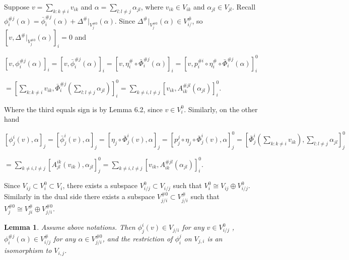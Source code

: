 \def\CTEXPreproc{Created by ctex v0.2.12, don't edit!}\documentclass[11pt]{article}
\newtheorem{lem}{Lemma}[section]
\begin{document}
\begin{pf} Suppose $v=\sum_{k:k\neq i} v_{ik}$ and $\alpha=\sum_{l:l\neq j} \alpha_{jl}$, where $v_{ik}\in V_{ik}$ and $\alpha_{jl}\in V_{jl}$. Recall $ \phi^{\# j} _i (\alpha )= \bar{\phi}^{\# j}_i (\alpha )+ \Delta^{\#}|_{V^{\# 0}_j }(\alpha)  $. Since
$ \Delta^{\#}|_{V^{\# 0}_j }(\alpha)\in V^{\#}_{i/}  $, so $[ v, \Delta^{\#}|_{V^{\# 0}_j }(\alpha)  ]_i =0$ and

$[  v, \phi^{\# j} _i (\alpha )   ]_i = [  v,\bar{ \phi}^{\# j} _i (\alpha )  ]_i =[  v,\eta^{\#}_i \circ \bar{\Phi}^{\# j} _i (\alpha )  ]_i = [v, p^{\# i}_i \circ \eta^{\#}_i \circ \bar{\Phi}^{\# j} _i (\alpha )   ]^{0} _i $

$= [\sum_{k:k\neq i} v_{ik}, \bar{\Phi}^{\# j} _i ( \sum_{l:l\neq j} \alpha_{jl})    ]^0 _i =\sum_{k\neq i,l\neq j} [v_{ik} , A^{\# jl}_{ik}( \alpha_{jl} )   ]^0 _i $.

Where the third equals sign is by Lemma 6.2, since $v\in V^0 _i $.
Similarly, on the other hand

$[ \phi^i _j (v) ,\alpha    ]_j  = [ \bar{\phi}^i _j (v) ,\alpha  ]_j =
[\eta_j \circ \bar{\Phi}^i _j (v) ,\alpha   ]_j =
[ p^j _j \circ \eta_j \circ \bar{\Phi}^i _j (v) ,\alpha   ]^0 _j = [ \bar{\Phi}^i _j ( \sum_{k:k\neq i}v_{ik}  ) , \sum_{l:l\neq j} \alpha_{jl}  ]^0 _j $

$=\sum_{k\neq i,l\neq j} [ A^{ik} _{jl}(v_{ik}) , \alpha_{jl}   ]^0 _j = \sum_{k\neq i,l\neq j} [v_{ik} , A^{\# jl}_{ik}( \alpha_{jl} )   ]^0 _i .  $\\

\end{pf}

Since $V_{ij}\subset V^0 _i \subset V_i$, there exists a subspace $V^0 _{i/j}\subset V_{i/j}$ such that
$V^0 _i \cong V_{ij}\oplus V^{0}_{i/j}$. Similarly in the dual side there exists a subspace $V^{\#0}_{j/i} \subset V^{\#}_{j/i} $ such that
$V^{\#0 }_{j} \cong V^{\#}_{ji}\oplus V^{\#0}_{j/i} $.

\begin{lem} Assume above notations. Then $ \phi^i _j (v) \in V_{j/i}   $ for any $v\in V^0 _{i/j}$  , $ \phi^{\#j}_i (\alpha)\in V^{\#}_{i/j} $ for any
$\alpha \in V^{\#0}_{j/i} $, and the restriction of $\phi^j _i $ on $ V_{j,i} $ is an isomorphism to $V_{i,j}$.
\end{lem}
\end{document}
